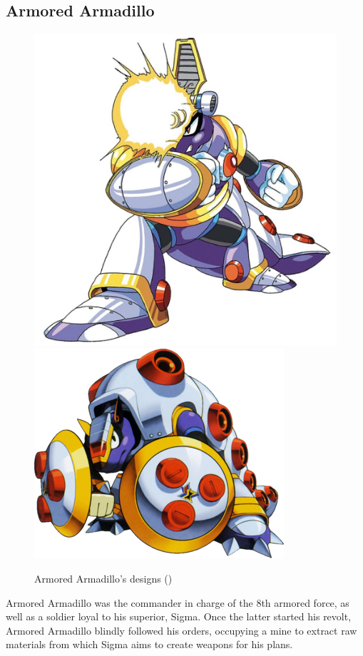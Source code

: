 \subsection{Armored Armadillo}\label{boss:Armored_Armadillo}
\begin{figure}[htp]
	\centering
	\includegraphics[width=0.3\linewidth]{figures/X1/Armored_armadillo/Armored_armadillo.jpg}
	\includegraphics[width=0.4\linewidth]{figures/X1/Armored_armadillo/MHXArmoredArmadillo.png}
	\caption{Armored Armadillo's designs (\cite{book:MMX_Complete_art})}
\end{figure}
Armored Armadillo was the commander in charge of the 8th armored force, as well as a soldier loyal to his superior, Sigma. Once the latter started his revolt, Armored Armadillo blindly followed his orders, occupying a mine to extract raw materials from which Sigma aims to create weapons for his plans.


